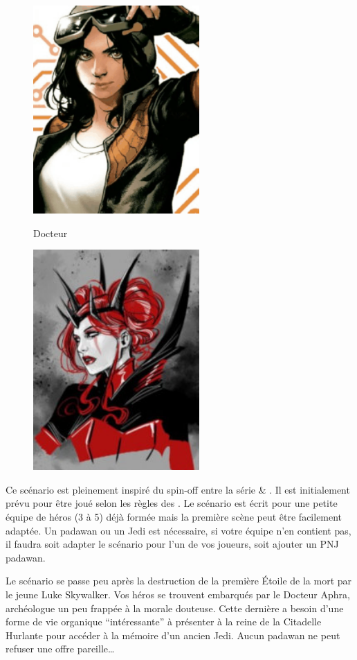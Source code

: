 \documentclass{jdrp}
\begin{document}
	\begin{figure}
		\centering
		\includegraphics[width=180pt]{_img/pnjs/aphra.png}
		\caption{Docteur }
		\vspace{1\baselineskip}
		\includegraphics[width=180pt]{_img/pnjs/ktath-atn-queen.jpg}
		\caption{}
	\end{figure}

	Ce scénario est pleinement inspiré du spin-off entre la série  \& . Il est initialement prévu pour être joué selon les règles des . Le scénario est écrit pour une petite équipe de héros (3 à 5) déjà formée mais la première scène peut être facilement adaptée. Un padawan ou un Jedi est nécessaire, si votre équipe n’en contient pas, il faudra soit adapter le scénario pour l’un de vos joueurs, soit ajouter un PNJ padawan.

    \bigbreak
    
    Le scénario se passe peu après la destruction de la première Étoile de la mort par le jeune Luke Skywalker. Vos héros se trouvent embarqués par le Docteur Aphra, archéologue un peu frappée à la morale douteuse. Cette dernière a besoin d’une forme de vie organique “intéressante” à présenter à la reine de la Citadelle Hurlante pour accéder à la mémoire d’un ancien Jedi. Aucun padawan ne peut refuser une offre pareille\dots
\end{document}

